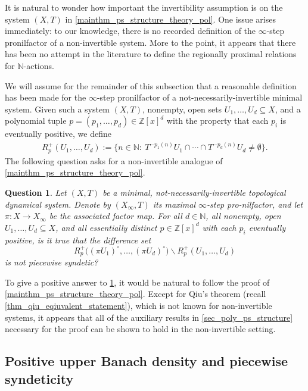 \documentclass{article}
\theoremstyle{plain}
\newtheorem{question}[Theorem]{Question}
\theoremstyle{claim}
\theoremstyle{definition}
\theoremstyle{plain}
\theoremstyle{plain}
\newcommand{\N}{\mathbb{N}}
\newcommand{\Z}{\mathbb{Z}}
\renewcommand{\setminus}{\backslash}
\newcommand{\1}{\boldsymbol{1}}
\begin{document}
It is natural to wonder how important the invertibility assumption is on the system $(X,T)$ in \cref{mainthm_ps_structure_theory_pol}.  One issue arises immediately: to our knowledge, there is no recorded definition of the $\infty$-step pronilfactor of a non-invertible system. More to the point, it appears that there has been no attempt in the literature to define the regionally proximal relations for $\N$-actions.

We will assume for the remainder of this subsection that a reasonable definition has been made for the $\infty$-step pronilfactor of a not-necessarily-invertible minimal system.  Given such a system $(X,T)$, nonempty, open sets $U_1,\ldots,U_d \subseteq X$, and a polynomial tuple $p = (p_1, \ldots, p_d) \in \Z[x]^d$ with the property that each $p_i$ is eventually positive, we define
\begin{align*}
    R^+_p(U_1,\dots,U_d):=\big\{n\in\N : \ T^{-p_1(n)} U_1\cap\cdots\cap T^{-p_d(n)}U_d\neq\emptyset \big\}.
\end{align*}
The following question asks for a non-invertible analogue of \cref{mainthm_ps_structure_theory_pol}.

\begin{question}
\label{quest_non_invert_thm_A}
    Let $(X,T)$ be a minimal, not-necessarily-invertible topological dynamical system. Denote by $(X_\infty,T)$ its maximal $\infty$-step pro-nilfactor, and let $\pi\colon X\to X_\infty$ be the associated factor map.
    For all $d \in \N$, all nonempty, open $U_1, \ldots, U_d \subseteq X$, and all essentially distinct $p \in \mathbb{Z}[x]^d$ with each $p_i$ eventually positive, is it true that the difference set
    \[
        R^+_p\big((\pi U_1)^\circ, \ldots, (\pi U_d)^\circ\big) \setminus R^+_p(U_1, \ldots, U_d)
    \]
    is not piecewise syndetic?
\end{question}

To give a positive answer to \cref{quest_non_invert_thm_A}, it would be natural to follow the proof of \cref{mainthm_ps_structure_theory_pol}.  Except for Qiu's theorem (recall \cref{thm_qiu_eqiuvalent_statement}), which is not known for non-invertible systems, it appears that all of the auxiliary results in \cref{sec_poly_ps_structure} necessary for the proof can be shown to hold in the non-invertible setting.




\subsection{Positive upper Banach density and piecewise syndeticity}
\label{sec_density_vs_ps}
\end{document}
